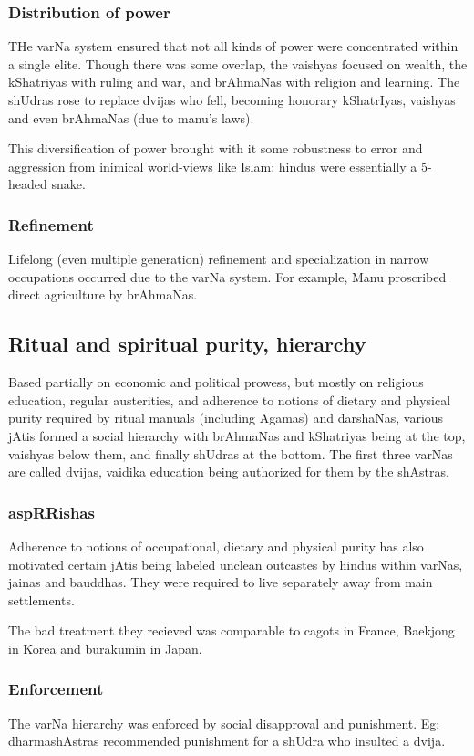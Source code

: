 \documentclass[oneside, article]{memoir}
\begin{document}
\subsubsection{Distribution of power}
THe varNa system ensured that not all kinds of power were concentrated within a single elite. Though there was some overlap, the vaishyas focused on wealth, the kShatriyas with ruling and war, and brAhmaNas with religion and learning. The shUdras rose to replace dvijas who fell, becoming honorary kShatrIyas, vaishyas and even brAhmaNas (due to manu's laws).

This diversification of power brought with it some robustness to error and aggression from inimical world-views like Islam: hindus were essentially a 5-headed snake.

\subsubsection{Refinement}
Lifelong (even multiple generation) refinement and specialization in narrow occupations occurred due to the varNa system. For example, Manu proscribed direct agriculture by brAhmaNas.

\subsection{Ritual and spiritual purity, hierarchy}
Based partially on economic and political prowess, but mostly on religious education, regular austerities, and adherence to notions of dietary and physical purity required by ritual manuals (including Agamas) and darshaNas, various jAtis formed a social hierarchy with brAhmaNas and kShatriyas being at the top, vaishyas below them, and finally shUdras at the bottom. The first three varNas are called dvijas, vaidika education being authorized for them by the shAstras.

\subsubsection{aspRRishas}
Adherence to notions of occupational, dietary and physical purity has also motivated certain jAtis being labeled unclean outcastes by hindus within varNas, jainas and bauddhas. They were required to live separately away from main settlements.

The bad treatment they recieved was comparable to cagots in France, Baekjong in Korea and burakumin in Japan.

\subsubsection{Enforcement}
The varNa hierarchy was enforced by social disapproval and punishment. Eg: dharmashAstras recommended punishment for a shUdra who insulted a dvija. 
\end{document}
